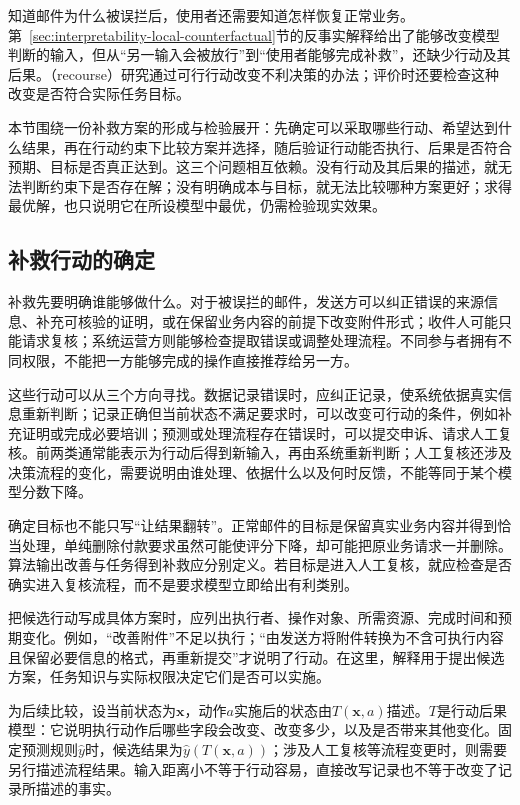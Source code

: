知道邮件为什么被误拦后，使用者还需要知道怎样恢复正常业务。第~\ref{sec:interpretability-local-counterfactual}节的反事实解释给出了能够改变模型判断的输入，但从“另一输入会被放行”到“使用者能够完成补救”，还缺少行动及其后果。（recourse）研究通过可行行动改变不利决策的办法；评价时还要检查这种改变是否符合实际任务目标。

本节围绕一份补救方案的形成与检验展开：先确定可以采取哪些行动、希望达到什么结果，再在行动约束下比较方案并选择，随后验证行动能否执行、后果是否符合预期、目标是否真正达到。这三个问题相互依赖。没有行动及其后果的描述，就无法判断约束下是否存在解；没有明确成本与目标，就无法比较哪种方案更好；求得最优解，也只说明它在所设模型中最优，仍需检验现实效果。

\subsection{补救行动的确定}
\label{sec:interpretability-recourse-target}

补救先要明确谁能够做什么。对于被误拦的邮件，发送方可以纠正错误的来源信息、补充可核验的证明，或在保留业务内容的前提下改变附件形式；收件人可能只能请求复核；系统运营方则能够检查提取错误或调整处理流程。不同参与者拥有不同权限，不能把一方能够完成的操作直接推荐给另一方。

这些行动可以从三个方向寻找。数据记录错误时，应纠正记录，使系统依据真实信息重新判断；记录正确但当前状态不满足要求时，可以改变可行动的条件，例如补充证明或完成必要培训；预测或处理流程存在错误时，可以提交申诉、请求人工复核。前两类通常能表示为行动后得到新输入，再由系统重新判断；人工复核还涉及决策流程的变化，需要说明由谁处理、依据什么以及何时反馈，不能等同于某个模型分数下降。

确定目标也不能只写“让结果翻转”。正常邮件的目标是保留真实业务内容并得到恰当处理，单纯删除付款要求虽然可能使评分下降，却可能把原业务请求一并删除。算法输出改善与任务得到补救应分别定义。若目标是进入人工复核，就应检查是否确实进入复核流程，而不是要求模型立即给出有利类别。

把候选行动写成具体方案时，应列出执行者、操作对象、所需资源、完成时间和预期变化。例如，“改善附件”不足以执行；“由发送方将附件转换为不含可执行内容且保留必要信息的格式，再重新提交”才说明了行动。在这里，解释用于提出候选方案，任务知识与实际权限决定它们是否可以实施。

为后续比较，设当前状态为$\bm{x}$，动作$a$实施后的状态由$T(\bm{x},a)$描述。$T$是行动后果模型：它说明执行动作后哪些字段会改变、改变多少，以及是否带来其他变化。固定预测规则$\hat y$时，候选结果为$\hat y(T(\bm{x},a))$；涉及人工复核等流程变更时，则需要另行描述流程结果。输入距离小不等于行动容易，直接改写记录也不等于改变了记录所描述的事实。

